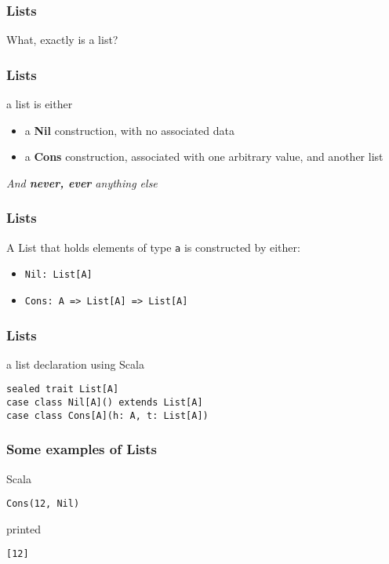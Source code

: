 \begin{frame}
\frametitle{Lists}
\begin{center}
What, exactly is a list?
\end{center}
\end{frame}

\begin{frame}
\frametitle{Lists}
\begin{block}{a list is either}
\begin{itemize}
\item a \textbf{Nil} construction, with no associated data
\item a \textbf{Cons} construction, associated with one arbitrary value, and another list
\end{itemize}
\end{block}
\emph{And \textbf{never, ever} anything else}
\end{frame}

\begin{frame}
\frametitle{Lists}
\begin{block}{A List that holds elements of type \lstinline{a} is constructed by either:}
  \begin{itemize}
  \item \lstinline{Nil: List[A]}
  \item \lstinline{Cons: A => List[A] => List[A]}
  \end{itemize}
\end{block}
\end{frame}

\begin{frame}[fragile]
\frametitle{Lists}
\begin{block}{a list declaration using Scala}
\begin{lstlisting}[style=scala,basicstyle=\scriptsize\ttfamily,mathescape]
sealed trait List[A]
case class Nil[A]() extends List[A]
case class Cons[A](h: A, t: List[A])
\end{lstlisting}
\end{block}
\end{frame}

\begin{frame}[fragile]
\frametitle{Some examples of Lists}
\begin{block}{Scala}
\begin{lstlisting}[style=scala,basicstyle=\scriptsize\ttfamily,mathescape]
Cons(12, Nil)
\end{lstlisting}
\end{block}
\begin{block}{printed}
\begin{lstlisting}[style=scala,basicstyle=\scriptsize\ttfamily,mathescape]
[12]
\end{lstlisting}
\end{block}
\end{frame}


